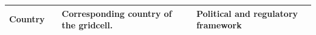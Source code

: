 \documentclass{article}
\begin{document}
\begin{table}[h]
\begin{tabular}{L{2cm}L{2cm}L{9cm}L{3cm}}
Country                                                                & \cite{}                                        & Corresponding country of the gridcell.                                                                                                                                                                                                                                                                                                                                                                                          & Political and regulatory framework                                                          \\
\bottomrule

\end{tabular}
\end{table}

\newpage
 

\end{document}
